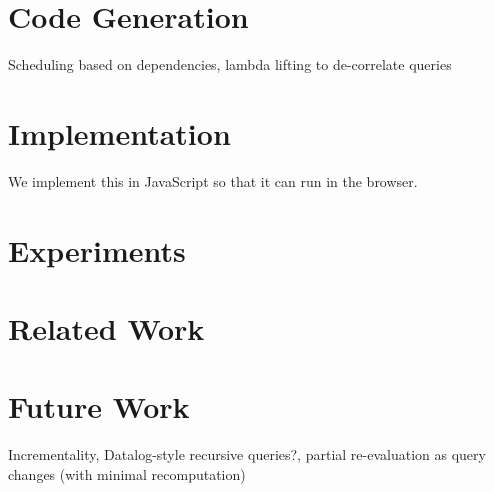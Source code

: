 \documentclass[runningheads]{llncs}
\begin{document}
\section{Code Generation}
Scheduling based on dependencies, lambda lifting to de-correlate queries

\section{Implementation}
We implement this in JavaScript so that it can run in the browser.

\section{Experiments}

\section{Related Work}

\section{Future Work}
Incrementality, Datalog-style recursive queries?, partial re-evaluation as
query changes (with minimal recomputation)
%
%



\end{document}
